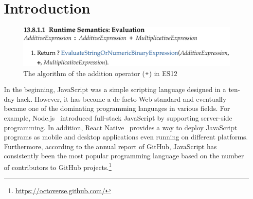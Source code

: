 \section{Introduction}\label{sec:intro}

\begin{figure}
  \centering
  \includegraphics[width=\columnwidth]{img/add-eval.png}
  \caption{The  algorithm of the addition operator
  ($\texttt{+}$) in ES12}
  \vspace*{-1em}
  \label{fig:add-eval}
\end{figure}

In the beginning, JavaScript was a simple scripting language designed in a
ten-day hack. However, it has become a de facto Web standard and eventually
became one of the dominating programming languages in various fields. For
example, Node.js~\cite{nodejs} introduced full-stack JavaScript by supporting
server-side programming.  In addition, React Native~\cite{react-native} provides
a way to deploy JavaScript programs as mobile and desktop applications even
running on different platforms.  Furthermore, according to the annual report of
GitHub, JavaScript has consistently been the most popular programming language
based on the number of contributors to GitHub
projects.\footnote{\url{https://octoverse.github.com/}}


